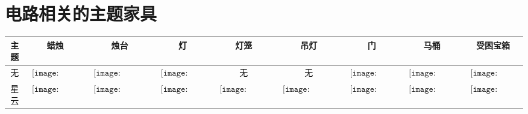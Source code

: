 \chapter{电路相关的主题家具}\label{app44}
\begin{longtable}{|c|cccccccc|}
\hline
主题&蜡烛&烛台&灯&灯笼&吊灯&门&马桶&受困宝箱\\\hline
\endhead
\hline
\endfoot
无&$\begin{array}{c}\texttt{[image: figures/Candle.png]}\end{array}$&$\begin{array}{c}\texttt{[image: figures/Candelabra.png]}\end{array}$&$\begin{array}{c}\texttt{[image: figures/Tiki\_Torch.png]}\end{array}$&无&无&$\begin{array}{c}\texttt{[image: figures/Wooden\_Door.png]}\end{array}$&$\begin{array}{c}\texttt{[image: figures/Toilet.png]}\end{array}$&$\begin{array}{c}\texttt{[image: figures/Chest.png]}\end{array}$\\
星云&$\begin{array}{c}\texttt{[image: figures/Nebula\_Candle.png]}\end{array}$&$\begin{array}{c}\texttt{[image: figures/Nebula\_Candelabra.png]}\end{array}$&$\begin{array}{c}\texttt{[image: figures/Nebula\_Lamp.png]}\end{array}$&$\begin{array}{c}\texttt{[image: figures/Nebula\_Lantern.png]}\end{array}$&$\begin{array}{c}\texttt{[image: figures/Nebula\_Chandelier.png]}\end{array}$&$\begin{array}{c}\texttt{[image: figures/Nebula\_Door.png]}\end{array}$&$\begin{array}{c}\texttt{[image: figures/Nebula\_Toilet.png]}\end{array}$&$\begin{array}{c}\texttt{[image: figures/Nebula\_Chest.png]}\end{array}$\\

\end{longtable}
